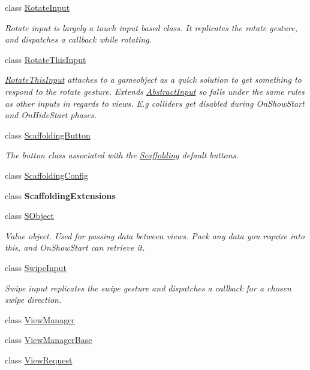 \begin{DoxyCompactItemize}
class \hyperlink{class_scaffolding_1_1_rotate_input}{Rotate\+Input}
\begin{DoxyCompactList}\small\item\em Rotate input is largely a touch input based class. It replicates the rotate gesture, and dispatches a callback while rotating. \end{DoxyCompactList}\item 
class \hyperlink{class_scaffolding_1_1_rotate_this_input}{Rotate\+This\+Input}
\begin{DoxyCompactList}\small\item\em \hyperlink{class_scaffolding_1_1_rotate_this_input}{Rotate\+This\+Input} attaches to a gameobject as a quick solution to get something to respond to the rotate gesture. Extends \hyperlink{class_scaffolding_1_1_abstract_input}{Abstract\+Input} so falls under the same rules as other inputs in regards to views. E.\+g colliders get disabled during On\+Show\+Start and On\+Hide\+Start phases. \end{DoxyCompactList}\item 
class \hyperlink{class_scaffolding_1_1_scaffolding_button}{Scaffolding\+Button}
\begin{DoxyCompactList}\small\item\em The button class associated with the \hyperlink{namespace_scaffolding}{Scaffolding} default buttons. \end{DoxyCompactList}\item 
class \hyperlink{class_scaffolding_1_1_scaffolding_config}{Scaffolding\+Config}
\item 
class {\bfseries Scaffolding\+Extensions}
\item 
class \hyperlink{class_scaffolding_1_1_s_object}{S\+Object}
\begin{DoxyCompactList}\small\item\em Value object. Used for passing data between views. Pack any data you require into this, and On\+Show\+Start can retrieve it. \end{DoxyCompactList}\item 
class \hyperlink{class_scaffolding_1_1_swipe_input}{Swipe\+Input}
\begin{DoxyCompactList}\small\item\em Swipe input replicates the swipe gesture and dispatches a callback for a chosen swipe direction. \end{DoxyCompactList}\item 
class \hyperlink{class_scaffolding_1_1_view_manager}{View\+Manager}
\item 
class \hyperlink{class_scaffolding_1_1_view_manager_base}{View\+Manager\+Base}
\item 
class \hyperlink{class_scaffolding_1_1_view_request}{View\+Request}
\end{DoxyCompactItemize}
